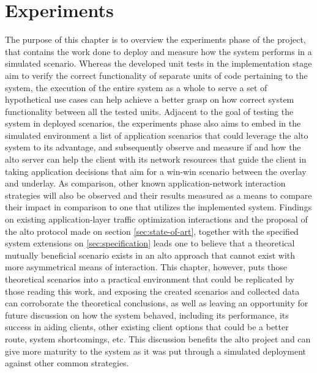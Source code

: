 \chapter{Experiments}

    The purpose of this chapter is to overview the experiments phase of the project, that contains the work done to deploy and measure how the system performs in a simulated scenario.
    Whereas the developed unit tests in the implementation stage aim to verify the correct functionality of separate units of code pertaining to the system, the execution of the entire system as a whole to serve a set of hypothetical use cases can help achieve a better grasp on how correct system functionality between all the tested units.
    Adjacent to the goal of testing the system in deployed scenarios, the experiments phase also aims to embed in the simulated environment a list of application scenarios that could leverage the \gls{alto} system to its advantage, and subsequently observe and measure if and how the \gls{alto} server can help the client with its network resources that guide the client in taking application decisions that aim for a win-win scenario between the overlay and underlay.
    As comparison, other known application-network interaction strategies will also be observed and their results measured as a means to compare their impact in comparison to one that utilizes the implemented system.
    Findings on existing application-layer traffic optimization interactions and the proposal of the \gls{alto} protocol made on section \ref{sec:state-of-art}, together with the specified system extensions on \ref{sec:specification} leads one to believe that a theoretical mutually beneficial scenario exists in an \gls{alto} approach that cannot exist with more asymmetrical means of interaction.
    This chapter, however, puts those theoretical scenarios into a practical environment that could be replicated by those reading this work, and exposing the created scenarios and collected data can corroborate the theoretical conclusions, as well as leaving an opportunity for future discussion on how the system behaved, including its performance, its success in aiding clients, other existing client options that could be a better route, system shortcomings, etc.
    This discussion benefits the \gls{alto} project and can give more maturity to the system as it was put through a simulated deployment against other common strategies.

